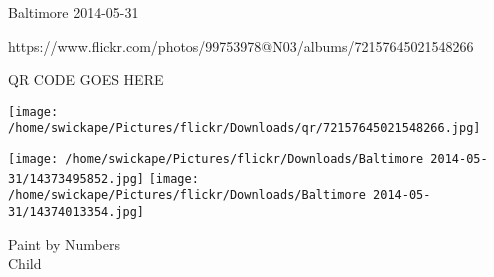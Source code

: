 \documentclass[10pt,letterpaper]{article}
\begin{document}
Baltimore 2014-05-31

https://www.flickr.com/photos/99753978@N03/albums/72157645021548266

QR CODE GOES HERE

\texttt{[image: /home/swickape/Pictures/flickr/Downloads/qr/72157645021548266.jpg]}
\pagebreak

\texttt{[image: /home/swickape/Pictures/flickr/Downloads/Baltimore 2014-05-31/14373495852.jpg]}
\texttt{[image: /home/swickape/Pictures/flickr/Downloads/Baltimore 2014-05-31/14374013354.jpg]}

Paint by Numbers\\
Child\\
\pagebreak
\end{document}
